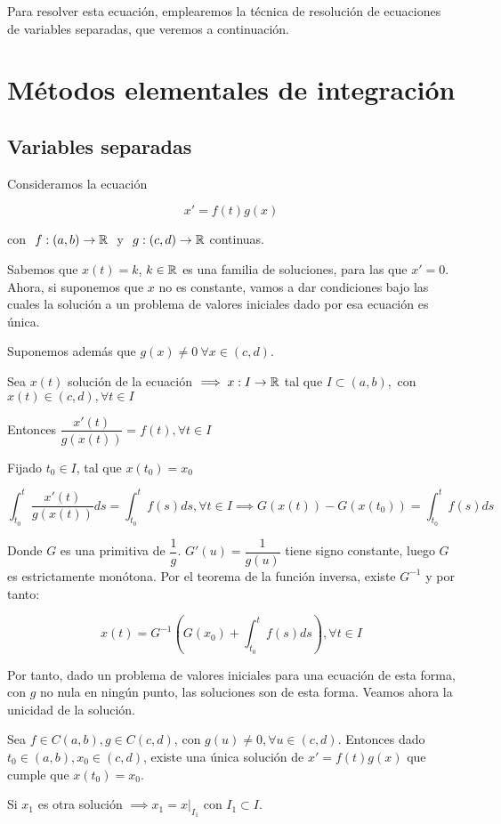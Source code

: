 Para resolver esta ecuación, emplearemos la técnica de resolución de ecuaciones de variables separadas, que veremos a continuación. 



\section{Métodos elementales de integración}


\subsection{Variables separadas}


Consideramos la ecuación

\[
x' = f(t)g(x)
\]

con $\ f:(a,b)\to \mathbb{R} \ $ y $\ g:(c,d) \to \mathbb{R}$ continuas.

Sabemos que $x(t) = k$, $k \in \mathbb{R}$ es una familia de soluciones, para las que $x' = 0$. Ahora, si suponemos que $x$
no es constante, vamos a dar condiciones bajo las cuales la solución a un problema de valores iniciales dado por esa
ecuación es única.

Suponemos además que $g(x) \neq 0 \ \forall x\in (c,d)$.

Sea $x(t)$ solución de la ecuación $\implies x:I \to \mathbb{R}$ tal que $I\subset (a,b),$ con $ x(t)\in (c,d), \forall t \in I$

Entonces $\dfrac{x'(t)}{g(x(t))} = f(t), \forall t \in I$

Fijado $t_0 \in I$, tal que $x(t_0) = x_0$

\[\int_{t_0}^{t}\frac{x'(t)}{g(x(t))} ds = \int_{t_0}^{t} f(s) ds, \forall t \in I \implies G(x(t)) - G(x(t_0)) = \int_{t_0}^{t}f(s) ds\]

Donde $G$ es una primitiva de $\dfrac{1}{g}$. $G'(u) = \dfrac{1}{g(u)}$ tiene signo constante, luego $G$ es estrictamente monótona. Por el teorema de la función inversa, existe $G^{-1}$ y por tanto:

\[x(t) = G^{-1}\left(G(x_0) + \int_{t_0}^{t}f(s) ds\right), \forall t \in I\]

Por tanto, dado un problema de valores iniciales para una ecuación de esta forma, con $g$ no nula en ningún punto, las soluciones son de esta forma. Veamos ahora la unicidad de la solución.

\begin{nth}
  Sea $f\in C(a,b), g\in C(c,d)$, con $g(u) \neq 0, \forall u \in (c,d)$. Entonces dado $t_0 \in (a,b), x_0 \in (c,d)$, existe una única solución de $x' = f(t)g(x)$ que cumple que $x(t_0) = x_0$.
  
Si $x_1$ es otra solución $\implies x_1 = x|_{I_1}$ con $I_1\subset I$.

\end{nth}

